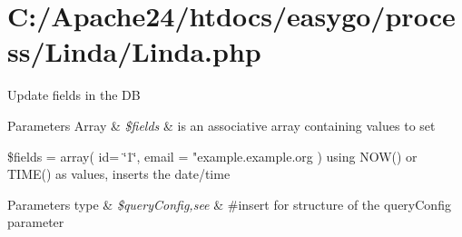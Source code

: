 \hypertarget{_c_1_2_apache24_2htdocs_2easygo_2process_2_linda_2_linda_8php-example}{}\section{C\+:/\+Apache24/htdocs/easygo/process/\+Linda/\+Linda.\+php}
Update fields in the D\+B


\begin{DoxyParams}[1]{Parameters}
Array & {\em \$fields} & is an associative array containing values to set\\
\hline
\end{DoxyParams}
\$fields = array( id= \char`\"{}1\char`\"{}, email = "example.\+example.\+org ) using N\+O\+W() or T\+I\+M\+E() as values, inserts the date/time 
\begin{DoxyParams}[1]{Parameters}
type & {\em \$query\+Config,see} & \#insert for structure of the query\+Config parameter\\
\hline
\end{DoxyParams}

